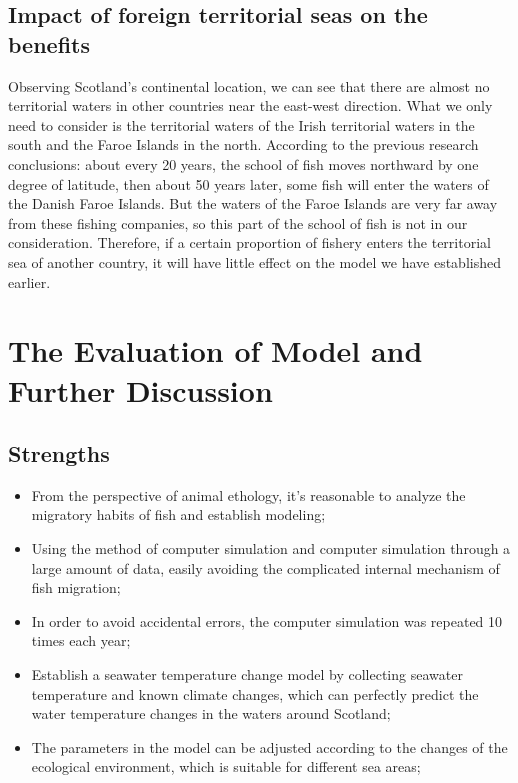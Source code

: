 \documentclass{mcmthesis}
\numberwithin{figure}{section}
\numberwithin{table}{section}
\begin{document}
\subsection{Impact of foreign territorial seas on the benefits}
Observing Scotland's continental location, we can see that there are almost no territorial waters in other countries near the east-west direction. What we only need to consider is the territorial waters of the Irish territorial waters in the south and the Faroe Islands in the north. According to the previous research conclusions: about every 20 years, the school of fish moves northward by one degree of latitude, then about 50 years later, some fish will enter the waters of the Danish Faroe Islands. But the waters of the Faroe Islands are very far away from these fishing companies, so this part of the school of fish is not in our consideration. Therefore, if a certain proportion of fishery enters the territorial sea of another country, it will have little effect on the model we have established earlier.

\section{The Evaluation of Model and Further Discussion}

\subsection{Strengths}

\begin{itemize}
  \item From the perspective of animal ethology, it's reasonable to analyze the migratory habits of fish and establish modeling;
  \item Using the method of computer simulation and computer simulation through a large amount of data, easily avoiding the complicated internal mechanism of fish migration;
  \item In order to avoid accidental errors, the computer simulation was repeated 10 times each year;
  \item Establish a seawater temperature change model by collecting seawater temperature and known climate changes, which can perfectly predict the water temperature changes in the waters around Scotland;
  \item The parameters in the model can be adjusted according to the changes of the ecological environment, which is suitable for different sea areas;
\end{itemize}
\end{document}
